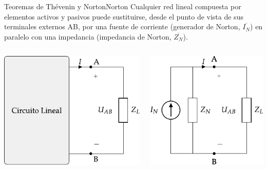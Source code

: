 \documentclass[aspectratio=169, xcolor={usenames,svgnames,dvipsnames}]{beamer}
\begin{document}
\begin{frame}{Teoremas de Thévenin y Norton}{Norton}
Cualquier \alert{red lineal} compuesta por elementos activos y pasivos puede sustituirse, desde el punto de vista de sus terminales externos AB, por una \alert{fuente de corriente} (generador de Norton, \(\overline{I_N}\)) en \alert{paralelo} con una impedancia (impedancia de Norton, \(\overline{Z_N}\)).


    \begin{columns}
      \begin{column}{0.5\linewidth}
        \begin{center}
          \includegraphics{../figs/EquivalenteThevenin.pdf}
        \end{center}
      \end{column}
      \begin{column}{0.5\linewidth}
        \begin{center}
          \includegraphics{../figs/EquivalenteNorton.pdf}
        \end{center}
      \end{column}
    \end{columns}
    
\end{frame}
\end{document}
